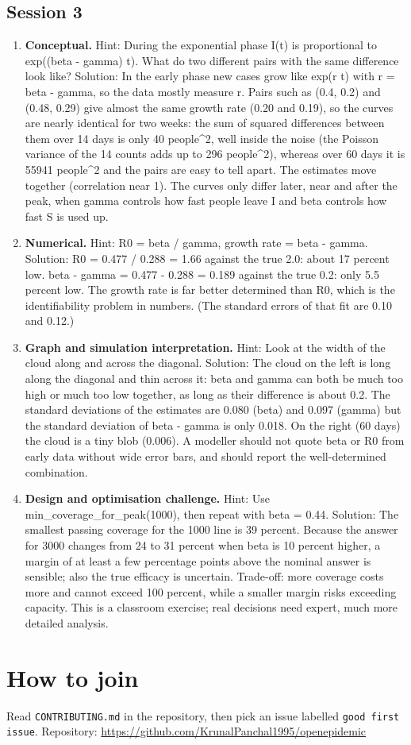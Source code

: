 \documentclass[11pt,a4paper]{article}
\begin{document}
\subsection*{Session 3}
\begin{enumerate}[nosep]
\item \textbf{Conceptual.} Hint: During the exponential phase I(t) is proportional to exp((beta - gamma) t). What do two different pairs with the same difference look like? Solution: In the early phase new cases grow like exp(r t) with r = beta - gamma, so the data mostly measure r. Pairs such as (0.4, 0.2) and (0.48, 0.29) give almost the same growth rate (0.20 and 0.19), so the curves are nearly identical for two weeks: the sum of squared differences between them over 14 days is only 40 people\textasciicircum{}2, well inside the noise (the Poisson variance of the 14 counts adds up to 296 people\textasciicircum{}2), whereas over 60 days it is 55941 people\textasciicircum{}2 and the pairs are easy to tell apart. The estimates move together (correlation near 1). The curves only differ later, near and after the peak, when gamma controls how fast people leave I and beta controls how fast S is used up.
\item \textbf{Numerical.} Hint: R0 = beta / gamma, growth rate = beta - gamma. Solution: R0 = 0.477 / 0.288 = 1.66 against the true 2.0: about 17 percent low. beta - gamma = 0.477 - 0.288 = 0.189 against the true 0.2: only 5.5 percent low. The growth rate is far better determined than R0, which is the identifiability problem in numbers. (The standard errors of that fit are 0.10 and 0.12.)
\item \textbf{Graph and simulation interpretation.} Hint: Look at the width of the cloud along and across the diagonal. Solution: The cloud on the left is long along the diagonal and thin across it: beta and gamma can both be much too high or much too low together, as long as their difference is about 0.2. The standard deviations of the estimates are 0.080 (beta) and 0.097 (gamma) but the standard deviation of beta - gamma is only 0.018. On the right (60 days) the cloud is a tiny blob (0.006). A modeller should not quote beta or R0 from early data without wide error bars, and should report the well-determined combination.
\item \textbf{Design and optimisation challenge.} Hint: Use min\_coverage\_for\_peak(1000), then repeat with beta = 0.44. Solution: The smallest passing coverage for the 1000 line is 39 percent. Because the answer for 3000 changes from 24 to 31 percent when beta is 10 percent higher, a margin of at least a few percentage points above the nominal answer is sensible; also the true efficacy is uncertain. Trade-off: more coverage costs more and cannot exceed 100 percent, while a smaller margin risks exceeding capacity. This is a classroom exercise; real decisions need expert, much more detailed analysis.
\end{enumerate}

\section{How to join}
Read \texttt{CONTRIBUTING.md} in the repository, then pick an issue labelled \texttt{good first issue}. Repository: \url{https://github.com/KrunalPanchal1995/openepidemic}
\end{document}
